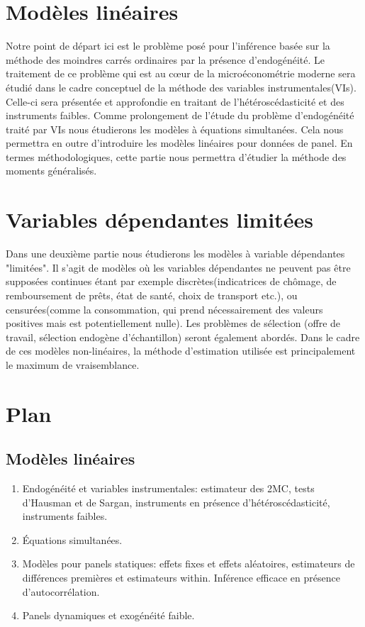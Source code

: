 \documentclass[10pt, reqno]{amsart}
\begin{document}
\section{Modèles linéaires}
Notre point de départ ici est le problème posé pour l'inférence 
basée sur la méthode des moindres carrés ordinaires par la présence d'endogénéité. 
Le traitement de ce problème qui est au cœur de la microéconométrie moderne sera étudié 
dans le cadre conceptuel de la méthode des variables instrumentales(VIs). 
Celle-ci sera présentée et approfondie en traitant de l'hétéroscédasticité et des instruments faibles. 
Comme prolongement de l'étude du problème d'endogénéité traité par VIs nous étudierons les modèles à équations simultanées.
Cela nous permettra en outre d'introduire les modèles linéaires pour données de panel. 
En termes méthodologiques, cette partie nous permettra d'étudier la méthode des moments généralisés.


\section{Variables dépendantes limitées}
 
 Dans une deuxième partie nous étudierons les modèles à variable dépendantes "limitées". Il s'agit de modèles 
 où les variables dépendantes ne peuvent pas être supposées continues étant par exemple discrètes(indicatrices de chômage, de remboursement de prêts, état de santé, choix de transport etc.),
 ou censurées(comme la consommation, qui prend nécessairement des valeurs positives mais est potentiellement nulle). 
 Les problèmes de sélection (offre de travail, sélection endogène d'échantillon) seront également abordés. 
 Dans le cadre de ces modèles non-linéaires, la méthode d'estimation utilisée est principalement 
 le maximum de vraisemblance.

 \section{Plan}
 \subsection{Modèles linéaires}
\begin{enumerate}
 \item Endogénéité et variables instrumentales: estimateur des 2MC, tests d'Hausman et de Sargan,
instruments en présence d'hétéroscédasticité, instruments faibles.
\item Équations simultanées.
\item Modèles pour panels statiques: effets fixes et effets aléatoires, estimateurs de différences premières 
et estimateurs within. Inférence efficace en présence d'autocorrélation.
\item Panels dynamiques et exogénéité faible.
\end{enumerate}
\end{document}
